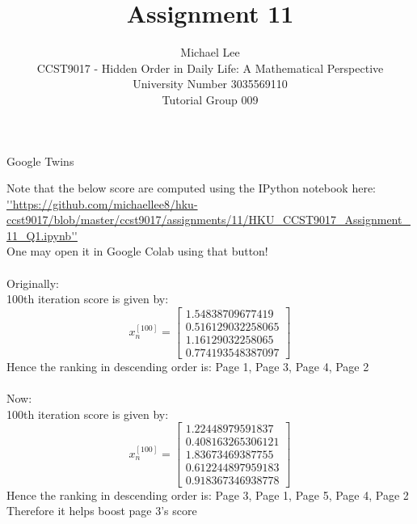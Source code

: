 \documentclass[12pt]{article}
\newenvironment{question}[2][Question]{\begin{trivlist}
    \item[\hskip \labelsep {\bfseries #1}\hskip \labelsep {\bfseries #2.}]}{\end{trivlist}}
\newenvironment{answer}[2][Answer]{\begin{trivlist}
    \item[\hskip \labelsep {\bfseries #1}\hskip \labelsep {\bfseries #2.}]}{\end{trivlist}}
\begin{document}


\title{Assignment 11}%
\author{Michael Lee\\ %
	CCST9017 - Hidden Order in Daily Life: A Mathematical Perspective \\
	University Number 3035569110 \\
	Tutorial Group 009
} %


\maketitle

\begin{question}{Q. 1}
	Google Twins
\end{question}
\begin{answer}{Q. 1}
    \hfill \break
    Note that the below score are computed using the IPython notebook here: \url{''https://github.com/michaellee8/hku-ccst9017/blob/master/ccst9017/assignments/11/HKU_CCST9017_Assignment_11_Q1.ipynb''} \\
    One may open it in Google Colab using that button! \\ \\
    Originally: \\
    100th iteration score is given by:
    \begin{equation}
        x^{[100]}_n=\left[\begin{matrix}1.54838709677419\\0.516129032258065\\1.16129032258065\\0.774193548387097\end{matrix}\right]
    \end{equation}
    Hence the ranking in descending order is: Page 1, Page 3, Page 4, Page 2 \\ \\
    Now: \\
    100th iteration score is given by:
    \begin{equation}
        x^{[100]}_n=\left[\begin{matrix}1.22448979591837\\0.408163265306121\\1.83673469387755\\0.612244897959183\\0.918367346938778\end{matrix}\right]
    \end{equation}
    Hence the ranking in descending order is: Page 3, Page 1, Page 5, Page 4, Page 2 \\
    Therefore it helps boost page 3's score
\end{answer}
\end{document}
